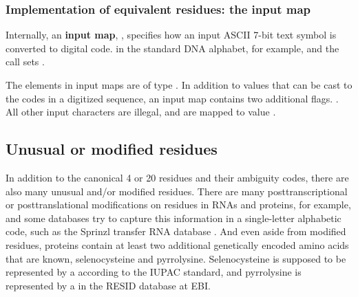 \subsubsection{Implementation of equivalent residues: the input map}

Internally, an \textbf{input map}, , specifies
how an input ASCII 7-bit text symbol is converted to digital
code.  in the standard DNA alphabet, for
example, and the call 
sets . 

The elements in input maps are of type . In addition
to values that can be cast to the  codes in a
digitized sequence, an input map contains two additional flags. 
. All other input characters are illegal, and are mapped to value
.



\subsection{Unusual or modified residues}

In addition to the canonical 4 or 20 residues and their ambiguity
codes, there are also many unusual and/or modified residues.  There
are many posttranscriptional or posttranslational modifications on
residues in RNAs and proteins, for example, and some databases try to
capture this information in a single-letter alphabetic code, such as
the Sprinzl transfer RNA database \cite{Sprinzl98}. And even aside
from modified residues, proteins contain at least two additional
genetically encoded amino acids that are known, selenocysteine and
pyrrolysine. Selenocysteine is supposed to be represented by a
 according to the IUPAC standard, and pyrrolysine is
represented by a  in the RESID database at EBI.

